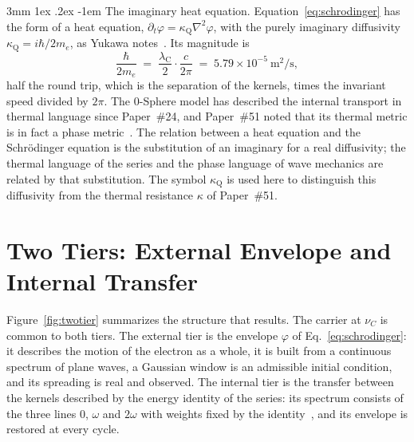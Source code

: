 \documentclass[%
 reprint, amsmath,amssymb, aps, prb, ]{revtex4-2}
\makeatletter
\numberwithin{equation}{section}
\renewcommand\paragraph{%
  \@startsection{paragraph}{4}{\z@}%
    {3mm \@plus 1ex \@minus .2ex}%
    {-1em}%
    {\normalfont\normalsize\itshape}}
\newcommand{\lambdaC}{\lambda_{\mathrm{C}}}
\makeatother
\begin{document}
\paragraph{The imaginary heat equation.} Equation~\eqref{eq:schrodinger} has the form of a heat equation, $\partial_t\varphi = \kappa_{\mathrm{Q}}\nabla^2\varphi$, with the purely imaginary diffusivity $\kappa_{\mathrm{Q}} = i\hbar/2m_e$, as Yukawa notes~\cite{Yukawa1954}. Its magnitude is
\begin{equation}
\frac{\hbar}{2m_e} \;=\; \frac{\lambdaC}{2}\cdot\frac{c}{2\pi} \;=\; 5.79\times10^{-5}\ \text{m}^2/\text{s},
\label{eq:diffusivity}
\end{equation}
half the round trip, which is the separation of the kernels, times the invariant speed divided by $2\pi$. The 0-Sphere model has described the internal transport in thermal language since Paper~\#24, and Paper~\#51 noted that its thermal metric is in fact a phase metric~\cite{H51}. The relation between a heat equation and the Schr\"odinger equation is the substitution of an imaginary for a real diffusivity; the thermal language of the series and the phase language of wave mechanics are related by that substitution. The symbol $\kappa_{\mathrm{Q}}$ is used here to distinguish this diffusivity from the thermal resistance $\kappa$ of Paper~\#51.

\section{Two Tiers: External Envelope and Internal Transfer}
\label{sec:twotier}

Figure~\ref{fig:twotier} summarizes the structure that results. The carrier at $\nu_C$ is common to both tiers. The external tier is the envelope $\varphi$ of Eq.~\eqref{eq:schrodinger}: it describes the motion of the electron as a whole, it is built from a continuous spectrum of plane waves, a Gaussian window is an admissible initial condition, and its spreading is real and observed. The internal tier is the transfer between the kernels described by the energy identity of the series: its spectrum consists of the three lines $0$, $\omega$ and $2\omega$ with weights fixed by the identity~\cite{H66}, and its envelope is restored at every cycle.
\end{document}
